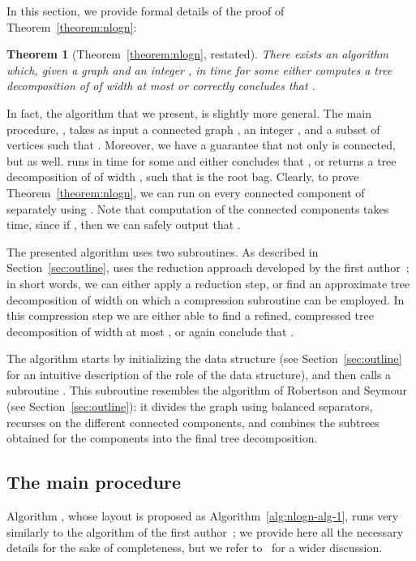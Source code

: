 \documentclass[a4paper,11pt]{article}
\newtheorem{theorem}{Theorem}
\theoremstyle{definition}
\theoremstyle{remark}
\begin{document}
In this section, we provide formal details of the proof of
Theorem~\ref{theorem:nlogn}:
\begin{theorem}[Theorem~\ref{theorem:nlogn}, restated]
  There exists an algorithm which, given a graph  and an integer
  , in  time for some 
  either computes a tree decomposition of  of width at most  or correctly concludes that .
\end{theorem}

In fact, the algorithm that we present, is slightly more general.  The
main procedure, , takes as input a connected graph , an
integer , and a subset of vertices  such that .  Moreover, we have a guarantee that not only  is connected,
but  as well.   runs in  time for some  and either concludes that , or returns a tree decomposition of  of width ,
such that  is the root bag.  Clearly, to prove
Theorem~\ref{theorem:nlogn}, we can run  on every connected
component of  separately using .  Note that
computation of the connected components takes  time,
since if , then we can safely output that .

The presented algorithm  uses two subroutines.  As described
in Section~\ref{sec:outline},  uses the reduction approach
developed by the first author~\cite{Bodlaender96}; in short words, we
can either apply a reduction step, or find an approximate tree
decomposition of width  on which a compression subroutine
 can be employed.  In this compression step we are
either able to find a refined, compressed tree decomposition of width
at most , or again conclude that .

The algorithm  starts by initializing the data structure
(see Section~\ref{sec:outline} for an intuitive description of the
role of the data structure), and then calls a subroutine .
This subroutine resembles the algorithm of Robertson and Seymour (see
Section~\ref{sec:outline}): it divides the graph using balanced
separators, recurses on the different connected components, and
combines the subtrees obtained for the components into the final tree
decomposition.

\subsection{The main procedure }

Algorithm , whose layout is proposed as
Algorithm~\ref{alg:nlogn-alg-1}, runs very similarly to the algorithm
of the first author~\cite{Bodlaender96}; we provide here all the
necessary details for the sake of completeness, but we refer
to~\cite{Bodlaender96} for a wider discussion.
\end{document}
